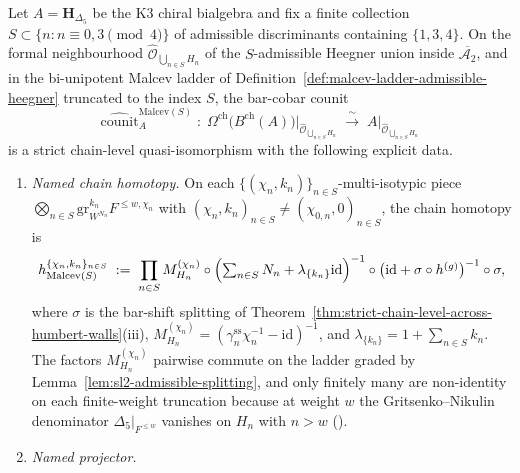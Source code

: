 \begin{theorem}
\label{thm:mc5-admissible-heegner-strict-chain-level}
\ClaimStatusConditional
{}%
%
%
Let $A=\mathbf{H}_{\Delta_5}$ be the K3 chiral bialgebra and fix a
finite collection $S\subset\{n : n\equiv 0,3\pmod 4\}$ of admissible
discriminants containing $\{1,3,4\}$. On the formal neighbourhood
$\widehat{\mathcal{O}}_{\bigcup_{n\in S}H_n}$ of the $S$-admissible
Heegner union inside $\overline{\mathcal{A}_2}$, and in the
bi-unipotent Malcev ladder of
Definition~\textup{\ref{def:malcev-ladder-admissible-heegner}}
truncated to the index $S$, the bar-cobar counit
\[
 \widehat{\mathrm{counit}}^{\mathrm{Malcev}(S)}_A
 \;\colon\;
 \Omega^{\mathrm{ch}}\bigl(B^{\mathrm{ch}}(A)\bigr)
 \big|_{\widehat{\mathcal{O}}_{\bigcup_{n\in S}H_n}}
 \;\xrightarrow{\;\sim\;}\;
 A\big|_{\widehat{\mathcal{O}}_{\bigcup_{n\in S}H_n}}
\]
is a strict chain-level quasi-isomorphism with the following explicit
data.
\begin{enumerate}[label=\textup{(\alph*)}]
\item \emph{Named chain homotopy.} On each
$\{(\chi_n,k_n)\}_{n\in S}$-multi-isotypic piece
$\bigotimes_{n\in S}\mathrm{gr}^{k_n}_{W^{N_n}}F^{\leq w,\chi_n}$ with
$(\chi_n,k_n)_{n\in S}\neq(\chi_{0,n},0)_{n\in S}$, the chain homotopy is
\begin{equation}
\label{eq:malcev-ladder-chain-homotopy}
h^{\{\chi_n,k_n\}_{n\in S}}_{\mathrm{Malcev}(S)}
\;:=\;
\prod_{n\in S}M^{(\chi_n)}_{H_n}
\circ
\Bigl(\textstyle\sum_{n\in S}N_n+\lambda_{\{k_n\}}\mathrm{id}\Bigr)^{-1}
\circ
\bigl(\mathrm{id}+\sigma\circ h^{(g)}\bigr)^{-1}
\circ
\sigma,
\end{equation}
where $\sigma$ is the bar-shift splitting of
Theorem~\textup{\ref{thm:strict-chain-level-across-humbert-walls}}(iii),
$M^{(\chi_n)}_{H_n}=(\gamma_n^{\mathrm{ss}}\chi_n^{-1}-\mathrm{id})^{-1}$,
and $\lambda_{\{k_n\}}=1+\sum_{n\in S}k_n$. The factors $M^{(\chi_n)}_{H_n}$
pairwise commute on the ladder graded by
Lemma~\textup{\ref{lem:sl2-admissible-splitting}}, and only finitely
many are non-identity on each finite-weight truncation because at
weight $w$ the Gritsenko--Nikulin denominator
$\Delta_5|_{F^{\leq w}}$ vanishes on $H_n$ with $n>w$
(\cite[\S 3]{GritsenkoNikulin1998}).
\item \emph{Named projector.}

\end{enumerate}
\end{theorem}
